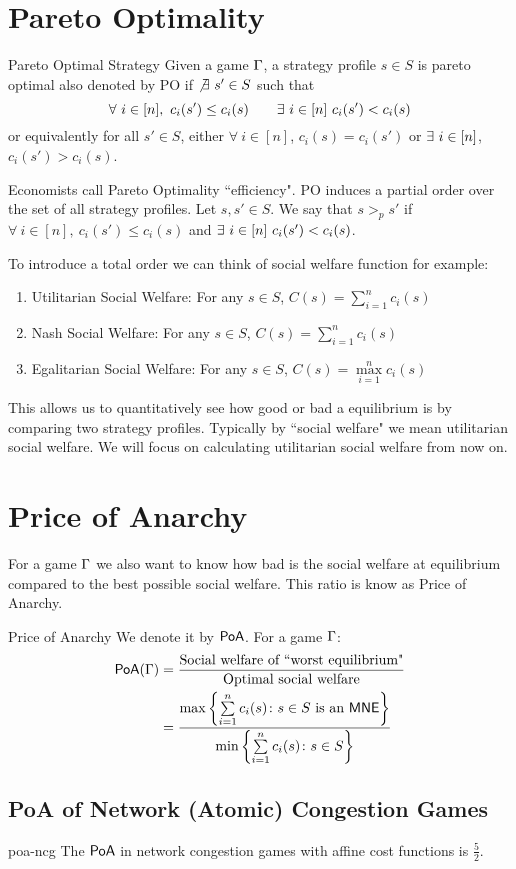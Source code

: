 \section{Pareto Optimality}
\begin{definition}{Pareto Optimal Strategy}{}
Given a game $\Gamma$, a strategy profile $s\in S$	is pareto optimal also denoted by \textsf{PO} if $\not\exists\ s'\in S$ such that $$\forall\ i\in[n],\ c_i(s')\leq c_i(s)\qquad\exs\ i\in[n]\ c_i(s')<c_i(s)$$or equivalently for all $s'\in S$, either $\forall\ i\in[n]$, $c_i(s)=c_i(s')$ or $\exists\ i\in[n]$, $c_i(s')>c_i(s)$.
\end{definition}

Economists call Pareto Optimality ``efficiency". \textsf{PO} induces a partial order over the set of all strategy profiles. Let $s,s'\in S$. We say that $s>_ps'$ if $\forall\ i\in[n],\ c_i(s')\leq c_i(s)$ and $\exs\ i\in[n]\ c_i(s')<c_i(s)$.

To introduce a total order we can think of  social welfare function for example:
\begin{enumerate}[label=(\arabic*)]
	\item Utilitarian Social Welfare: For any $s\in S$, $C(s)=\sum\limits_{i=1}^n c_i(s)$
	\item Nash Social Welfare: For any $s\in S$, $C(s)=\sum\limits_{i=1}^n c_i(s)$
	\item Egalitarian Social Welfare: For any $s\in S$, $C(s)=\max\limits_{i=1}^n c_i(s)$
\end{enumerate}This allows us to quantitatively see how good or bad a equilibrium is by comparing two strategy profiles. Typically by ``social welfare" we mean utilitarian social welfare. We will focus on calculating utilitarian social welfare from now on.
\section{Price of Anarchy}

For a game $\Gamma$ we also want to know how bad is the social welfare at equilibrium compared to the best possible social welfare. This ratio is know as Price of Anarchy.
\begin{definition}{Price of Anarchy}{}
	We denote it by $\operatorname{\mathsf{PoA}}$. For a game $\Gamma$:\begin{align*}
		\operatorname{\mathsf{PoA}}(\Gamma)& =\frac{\text{Social welfare of ``worst equilibrium"}}{\text{Optimal social welfare}}\\
		&= \frac{\max\left\{\sum\limits_{i=1}^n c_i(s)\colon s\in S\text{ is an $\operatorname{\mathsf{MNE}}$}\right\}}{\min\left\{\sum\limits_{i=1}^n c_i(s)\colon s\in S\right\}}
	\end{align*}
\end{definition}
\subsection{\textbf{\textsf{PoA}} of Network (Atomic) Congestion Games}
\begin{Theorem}{}{poa-ncg}
	The $\operatorname{\mathsf{PoA}}$ in network congestion games with affine cost functions is $\frac{5}2$.
\end{Theorem}

